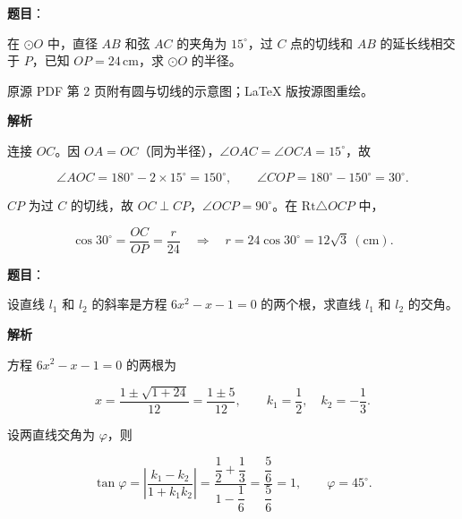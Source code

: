 \begin{answer}

\textbf{题目}：

在 $\odot O$ 中，直径 $AB$ 和弦 $AC$ 的夹角为 $15^{\circ}$，过 $C$ 点的切线和 $AB$ 的延长线相交于 $P$，已知 $OP=24\,\mathrm{cm}$，求 $\odot O$ 的半径。

\begin{gktip}
原源 PDF 第 2 页附有圆与切线的示意图；LaTeX 版按源图重绘。
\end{gktip}
\nopagebreak[4]
\begin{center}\end{center}
\nopagebreak[4]
\textbf{解析}

连接 $OC$。因 $OA=OC$（同为半径），$\angle OAC=\angle OCA=15^{\circ}$，故

\nopagebreak[4]
\[
\angle AOC=180^{\circ}-2\times15^{\circ}=150^{\circ},
\qquad
\angle COP=180^{\circ}-150^{\circ}=30^{\circ}.
\]

$CP$ 为过 $C$ 的切线，故 $OC\perp CP$，$\angle OCP=90^{\circ}$。在 $\mathrm{Rt}\triangle OCP$ 中，

\nopagebreak[4]
\[
\cos30^{\circ}=\frac{OC}{OP}=\frac{r}{24}
\quad\Longrightarrow\quad
r=24\cos30^{\circ}=12\sqrt{3}\ (\mathrm{cm}).
\]
\nopagebreak[4]
\begin{center}\end{center}
\nopagebreak[4]

\end{answer}
\begin{answer}

\textbf{题目}：

设直线 $l_{1}$ 和 $l_{2}$ 的斜率是方程 $6x^{2}-x-1=0$ 的两个根，求直线 $l_{1}$ 和 $l_{2}$ 的交角。

\textbf{解析}

方程 $6x^{2}-x-1=0$ 的两根为

\nopagebreak[4]
\[
x=\frac{1\pm\sqrt{1+24}}{12}=\frac{1\pm5}{12},
\qquad
k_{1}=\frac{1}{2},\quad k_{2}=-\frac{1}{3}.
\]

设两直线交角为 $\varphi$，则

\nopagebreak[4]
\[
\tan\varphi
=\left|\frac{k_{1}-k_{2}}{1+k_{1}k_{2}}\right|
=\frac{\dfrac{1}{2}+\dfrac{1}{3}}{1-\dfrac{1}{6}}
=\frac{\dfrac{5}{6}}{\dfrac{5}{6}}=1,
\qquad
\varphi=45^{\circ}.
\]


\end{answer}
